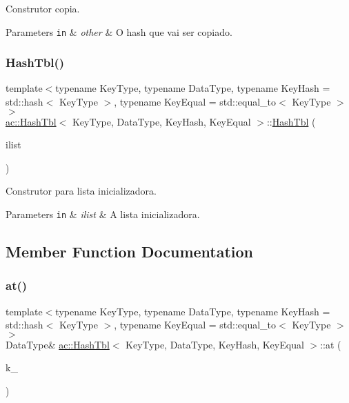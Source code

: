 Construtor copia. 


\begin{DoxyParams}[1]{Parameters}
\mbox{\tt in}  & {\em other} & O hash que vai ser copiado. \\
\hline
\end{DoxyParams}
\mbox{\label{classac_1_1HashTbl_ab88aa3e7c646fe6310bea58097a72dc1}} 
\subsubsection{\texorpdfstring{Hash\+Tbl()}{HashTbl()}\hspace{0.1cm}{\footnotesize\ttfamily [3/3]}}
{\footnotesize\ttfamily template$<$typename Key\+Type, typename Data\+Type, typename Key\+Hash = std\+::hash$<$ Key\+Type $>$, typename Key\+Equal = std\+::equal\+\_\+to$<$ Key\+Type $>$$>$ \\
\hyperlink{classac_1_1HashTbl}{ac\+::\+Hash\+Tbl}$<$ Key\+Type, Data\+Type, Key\+Hash, Key\+Equal $>$\+::\hyperlink{classac_1_1HashTbl}{Hash\+Tbl} (\begin{DoxyParamCaption}\item[{std\+::initializer\+\_\+list$<$ \hyperlink{classac_1_1HashEntry}{Entry} $>$}]{ilist }\end{DoxyParamCaption})\hspace{0.3cm}{\ttfamily [inline]}}



Construtor para lista inicializadora. 


\begin{DoxyParams}[1]{Parameters}
\mbox{\tt in}  & {\em ilist} & A lista inicializadora. \\
\hline
\end{DoxyParams}


\subsection{Member Function Documentation}
\mbox{\label{classac_1_1HashTbl_ac0933c629084aa2c996ecadc9dcee451}} 
\subsubsection{\texorpdfstring{at()}{at()}}
{\footnotesize\ttfamily template$<$typename Key\+Type, typename Data\+Type, typename Key\+Hash = std\+::hash$<$ Key\+Type $>$, typename Key\+Equal = std\+::equal\+\_\+to$<$ Key\+Type $>$$>$ \\
Data\+Type\& \hyperlink{classac_1_1HashTbl}{ac\+::\+Hash\+Tbl}$<$ Key\+Type, Data\+Type, Key\+Hash, Key\+Equal $>$\+::at (\begin{DoxyParamCaption}\item[{const Key\+Type \&}]{k\+\_\+ }\end{DoxyParamCaption})\hspace{0.3cm}{\ttfamily [inline]}}



